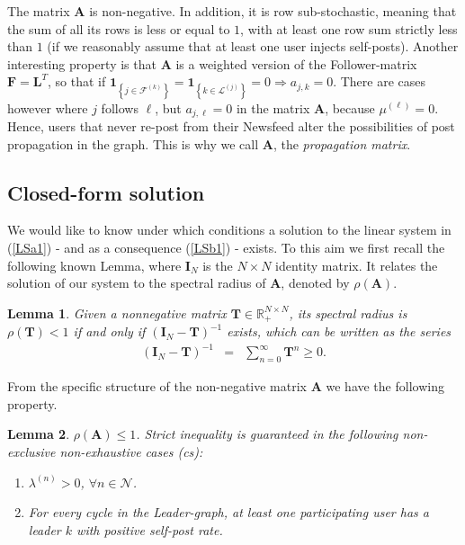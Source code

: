 \documentclass[10pt, conference, letterpaper]{IEEEtran}
\newtheorem{lem}{Lemma}
\begin{document}
{The matrix $\mathbf{A}$ is non-negative. In addition, it is row sub-stochastic, meaning that the sum of all its rows is less or equal to $1$, with at least one row sum strictly less than $1$ (if we reasonably assume that at least one user injects self-posts). Another interesting property is that $\mathbf{A}$ is a weighted version of the Follower-matrix $\mathbf{F}=\mathbf{L}^T$, so that if $\mathbf{1}_{\left\{j\in\mathcal{F}^{(k)}\right\}} = \mathbf{1}_{\left\{k\in\mathcal{L}^{(j)}\right\}} = 0 \Rightarrow a_{j,k}=0$. There are cases however where $j$ follows $\ell$, but $a_{j,\ell}=0$ in the matrix $\mathbf{A}$, because $\mu^{(\ell)}=0$. Hence, users that never re-post from their Newsfeed %
alter the possibilities of post propagation in the graph. This is why we call $\mathbf{A}$, the \textit{propagation matrix}.

\subsection{Closed-form solution}
We would like to know under which conditions a solution to the linear system in (\ref{LSa1}) - and as a consequence (\ref{LSb1}) - exists. To this aim we first recall the following known Lemma, where $\mathbf{I}_N$ is the $N\times N$ identity matrix. It relates the solution of our system to the spectral radius of $\mathbf{A}$, denoted by $\rho(\mathbf{A})$.

\begin{lem}\cite[Chapter 6, Lemma 2.1]{BerPleNN}
\label{Lemma1}
Given a nonnegative matrix $\mathbf{T}\in\mathbb{R}_+^{N\times N}$, its spectral radius is $\rho(\mathbf{T})<1$ if and only if $(\mathbf{I}_N - \mathbf{T})^{-1}$ exists, which can be written as the series
\begin{eqnarray}
\label{series}
(\mathbf{I}_N - \mathbf{T})^{-1} & = & \sum_{n=0}^{\infty} \mathbf{T}^n\geq 0.
\end{eqnarray}
\end{lem}
From the specific structure of the non-negative matrix $\mathbf{A}$ we have the following property.

\begin{lem}
\label{Lemma2}
$\rho(\mathbf{A})\leq 1$. Strict inequality is guaranteed in the following non-exclusive non-exhaustive cases (cs):
\begin{enumerate}[(cs1)]
\item $\lambda^{(n)}>0$, $\forall n\in\mathcal{N}$.%
\item For every cycle in the Leader-graph, at least one participating user has a leader $k$ with positive self-post rate.
\end{enumerate}
\end{lem}

}
\end{document}
